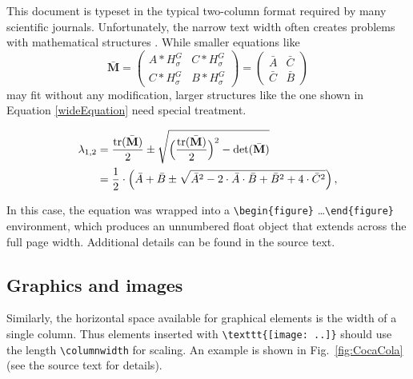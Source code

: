 \documentclass[a4paper,twocolumn,english,11pt]{article}
\begin{document}
This document is typeset in the typical two-column format required by many
scientific journals. Unfortunately, the narrow text width often creates problems 
with mathematical structures \parencite{Voss2014}. 
While smaller equations like
%
\begin{equation}
\bar{\mathbf{M}} =  
\begin{pmatrix}
	A \ast H^{G}_{\sigma}   & C \ast H^{G}_{\sigma} \\
	C \ast H^{G}_{\sigma}   & B \ast H^{G}_{\sigma} 
\end{pmatrix}
=
\begin{pmatrix}
	\bar{A}   & \bar{C} \\
	\bar{C}   & \bar{B} 
\end{pmatrix}
\end{equation}
%
may fit without any modification, larger structures like
the one shown in Equation \ref{wideEquation} need special treatment.
%
\begin{figure}[t]
\begin{equation}
\begin{split}
\lambda_{1,2} 
&= \frac{\mathrm{tr}(\bar{\mathbf{M}})}{2} \pm \sqrt{\Bigl(\frac{\mathrm{tr}(\bar{\mathbf{M}})}{2}\Bigr)^2 
                      - \mathrm{det}(\bar{\mathbf{M}})}  \\
&= \frac{1}{2} \cdot \left( \bar{A} + \bar{B} \pm \sqrt{\bar{A}^2 - 
		2 \cdot \bar{A} \cdot \bar{B} + \bar{B}^2 + 4 \cdot \bar{C}^2} \right) 
		,
\end{split}
\label{wideEquation}
\end{equation}
\end{figure}
%
In this case, the equation was wrapped into a
\verb!\begin{figure}! \ldots \verb!\end{figure}!
environment, which produces an unnumbered float object that extends
across the full page width.
Additional details can be found in the source text.


\subsection{Graphics and images}

Similarly, the horizontal space available for graphical elements is the width
of a single column. Thus elements inserted with \verb!\texttt{[image: ..]}! 
should use the length \verb!\columnwidth!
for scaling. An example is shown in Fig.~\ref{fig:CocaCola} (see the source text for
details).
\end{document}
